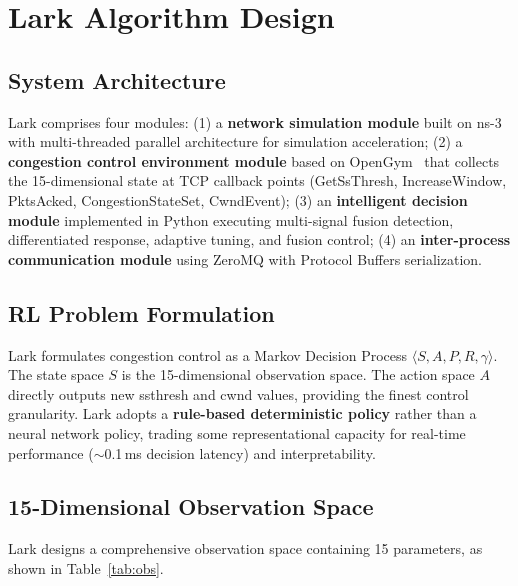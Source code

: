 \documentclass[10pt,twocolumn]{article}
\begin{document}
\section{Lark Algorithm Design}

\subsection{System Architecture}

Lark comprises four modules: (1) a \textbf{network simulation module} built on ns-3~\cite{ns3} with multi-threaded parallel architecture for simulation acceleration; (2) a \textbf{congestion control environment module} based on OpenGym~\cite{opengym} that collects the 15-dimensional state at TCP callback points (GetSsThresh, IncreaseWindow, PktsAcked, CongestionStateSet, CwndEvent); (3) an \textbf{intelligent decision module} implemented in Python executing multi-signal fusion detection, differentiated response, adaptive tuning, and fusion control; (4) an \textbf{inter-process communication module} using ZeroMQ with Protocol Buffers serialization.

\subsection{RL Problem Formulation}

Lark formulates congestion control as a Markov Decision Process $\langle S, A, P, R, \gamma \rangle$. The state space $S$ is the 15-dimensional observation space. The action space $A$ directly outputs new ssthresh and cwnd values, providing the finest control granularity. Lark adopts a \textbf{rule-based deterministic policy} rather than a neural network policy, trading some representational capacity for real-time performance ($\sim$0.1\,ms decision latency) and interpretability.

\subsection{15-Dimensional Observation Space}

Lark designs a comprehensive observation space containing 15 parameters, as shown in Table~\ref{tab:obs}.
\end{document}
